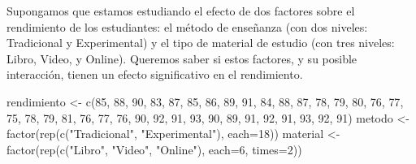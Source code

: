 \documentclass[
  letterpaper,
  DIV=11,
  numbers=noendperiod]{scrreprt}
\newenvironment{Shaded}{\begin{snugshade}}{\end{snugshade}}
\newcommand{\AttributeTok}[1]{\textcolor[rgb]{0.40,0.45,0.13}{#1}}
\newcommand{\DecValTok}[1]{\textcolor[rgb]{0.68,0.00,0.00}{#1}}
\newcommand{\FunctionTok}[1]{\textcolor[rgb]{0.28,0.35,0.67}{#1}}
\newcommand{\NormalTok}[1]{\textcolor[rgb]{0.00,0.23,0.31}{#1}}
\newcommand{\OtherTok}[1]{\textcolor[rgb]{0.00,0.23,0.31}{#1}}
\newcommand{\StringTok}[1]{\textcolor[rgb]{0.13,0.47,0.30}{#1}}
\begin{document}
\begin{tcolorbox}[enhanced jigsaw, arc=.35mm, breakable, coltitle=black, left=2mm, opacityback=0, bottomtitle=1mm, colbacktitle=quarto-callout-tip-color!10!white, title=\textcolor{quarto-callout-tip-color}{\faLightbulb}\hspace{0.5em}{Ejemplo. ANOVA de dos factores con interacción}, titlerule=0mm, colback=white, colframe=quarto-callout-tip-color-frame, bottomrule=.15mm, rightrule=.15mm, opacitybacktitle=0.6, toptitle=1mm, toprule=.15mm, leftrule=.75mm]

Supongamos que estamos estudiando el efecto de dos factores sobre el
rendimiento de los estudiantes: el método de enseñanza (con dos niveles:
Tradicional y Experimental) y el tipo de material de estudio (con tres
niveles: Libro, Video, y Online). Queremos saber si estos factores, y su
posible interacción, tienen un efecto significativo en el rendimiento.

\begin{Shaded}
\begin{Highlighting}[]
\NormalTok{rendimiento }\OtherTok{\textless{}{-}} \FunctionTok{c}\NormalTok{(}\DecValTok{85}\NormalTok{, }\DecValTok{88}\NormalTok{, }\DecValTok{90}\NormalTok{, }\DecValTok{83}\NormalTok{, }\DecValTok{87}\NormalTok{, }\DecValTok{85}\NormalTok{, }\DecValTok{86}\NormalTok{, }\DecValTok{89}\NormalTok{, }\DecValTok{91}\NormalTok{, }\DecValTok{84}\NormalTok{, }\DecValTok{88}\NormalTok{, }\DecValTok{87}\NormalTok{,}
                 \DecValTok{78}\NormalTok{, }\DecValTok{79}\NormalTok{, }\DecValTok{80}\NormalTok{, }\DecValTok{76}\NormalTok{, }\DecValTok{77}\NormalTok{, }\DecValTok{75}\NormalTok{, }\DecValTok{78}\NormalTok{, }\DecValTok{79}\NormalTok{, }\DecValTok{81}\NormalTok{, }\DecValTok{76}\NormalTok{, }\DecValTok{77}\NormalTok{, }\DecValTok{76}\NormalTok{,}
                 \DecValTok{90}\NormalTok{, }\DecValTok{92}\NormalTok{, }\DecValTok{91}\NormalTok{, }\DecValTok{93}\NormalTok{, }\DecValTok{90}\NormalTok{, }\DecValTok{89}\NormalTok{, }\DecValTok{91}\NormalTok{, }\DecValTok{92}\NormalTok{, }\DecValTok{91}\NormalTok{, }\DecValTok{93}\NormalTok{, }\DecValTok{92}\NormalTok{, }\DecValTok{91}\NormalTok{)}
\NormalTok{metodo }\OtherTok{\textless{}{-}} \FunctionTok{factor}\NormalTok{(}\FunctionTok{rep}\NormalTok{(}\FunctionTok{c}\NormalTok{(}\StringTok{"Tradicional"}\NormalTok{, }\StringTok{"Experimental"}\NormalTok{), }\AttributeTok{each=}\DecValTok{18}\NormalTok{))}
\NormalTok{material }\OtherTok{\textless{}{-}} \FunctionTok{factor}\NormalTok{(}\FunctionTok{rep}\NormalTok{(}\FunctionTok{c}\NormalTok{(}\StringTok{"Libro"}\NormalTok{, }\StringTok{"Video"}\NormalTok{, }\StringTok{"Online"}\NormalTok{), }\AttributeTok{each=}\DecValTok{6}\NormalTok{, }\AttributeTok{times=}\DecValTok{2}\NormalTok{))}


\end{Highlighting}
\end{Shaded}
\end{tcolorbox}
\end{document}
